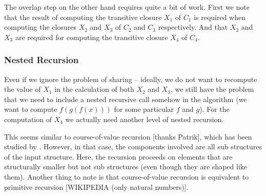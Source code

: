 \documentclass{article}
\newcommand{\Conid}[1]{\mathit{#1}}
\newcommand{\Varid}[1]{\mathit{#1}}
\def\resethooks{%
  \global\let\SaveRestoreHook\empty
  \global\let\ColumnHook\empty}
\newlength{\blanklineskip}
\let\hspre\empty
\let\hspost\empty
\begin{document}
\resethooks

The overlap step on the other hand requires quite a bit of work. 
First we note that the result of computing the transitive closure $X_1$ of $C_1$ is required when computing the closures $X_2$ and $X_3$ of $C_2$ and $C_3$ respectively. And that $X_2$ and $X_3$ are required for computing the transitive closure $X_4$ of $C_4$.

\subsubsection{Nested Recursion}
Even if we ignore the problem of sharing -- ideally, we do not want to recompute the value of $X_1$ in the calculation of both $X_2$ and $X_3$, we still have the problem that we need to include a nested recursive call somehow in the algorithm (we want to compute $f (g(f(x)))$ for some particular $f$ and $g$). For the computation of $X_4$ we actually need another level of nested recursion.

This seems similar to course-of-value recursion [thanks Patrik], which has been studied by \cite{histomorphism1}. However, in that case, the components involved are all sub structures of the input structure. Here, the recursion proceeds on elements that are structurally smaller but not sub structures (even though they are shaped like them). Another thing to note is that course-of-value recursion is equivalent to primitive recursion [WIKIPEDIA (only natural numbers)].
\end{document}
